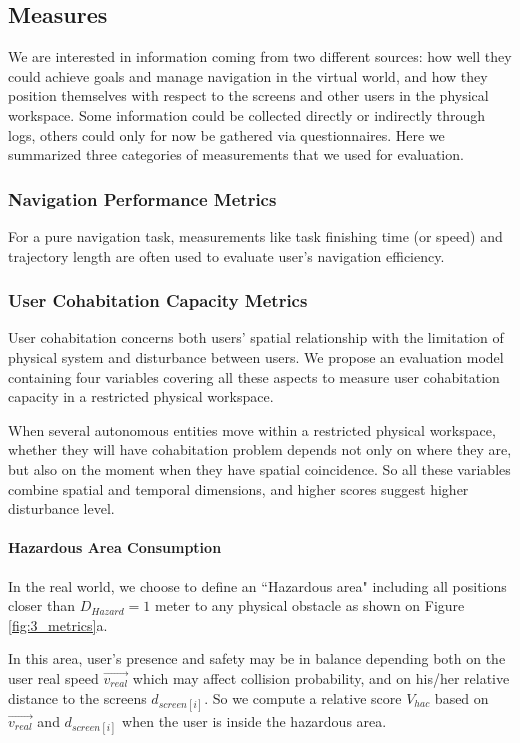 \subsection{Measures}
We are interested in information coming from two different sources: how well they could achieve goals and manage navigation in the virtual world, and how they position themselves with respect to the screens and other users in the physical workspace. Some information could be collected directly or indirectly through logs, others could only for now be gathered via questionnaires. Here we summarized three categories of measurements that we used for evaluation.

\subsubsection{Navigation Performance Metrics}
For a pure navigation task, measurements like task finishing time (or speed) and trajectory length are often used to evaluate user's navigation efficiency.

\subsubsection{User Cohabitation Capacity Metrics}
User cohabitation concerns both users' spatial relationship with the limitation of physical system and disturbance between users. We propose an evaluation model containing four variables covering all these aspects to measure user cohabitation capacity in a restricted physical workspace.

When several autonomous entities move within a restricted physical workspace, whether they will have cohabitation problem depends not only on where they are, but also on the moment when they have spatial coincidence. So all these variables combine spatial and temporal dimensions, and higher scores suggest higher disturbance level.

\paragraph{\textbf{Hazardous Area Consumption}}
In the real world, we choose to define an ``Hazardous area" including all positions closer than $D_{Hazard}=1$ meter to any physical obstacle as shown on Figure \ref{fig:3_metrics}a.

In this area, user's presence and safety may be in balance depending both on the user real speed $\overrightarrow{v_{real}}$ which may affect collision probability, and on his/her relative distance to the screens $d_{screen[i]}$. So we compute a relative score $V_{hac}$ based on $\overrightarrow{v_{real}}$ and $d_{screen[i]}$ when the user is inside the hazardous area. 

